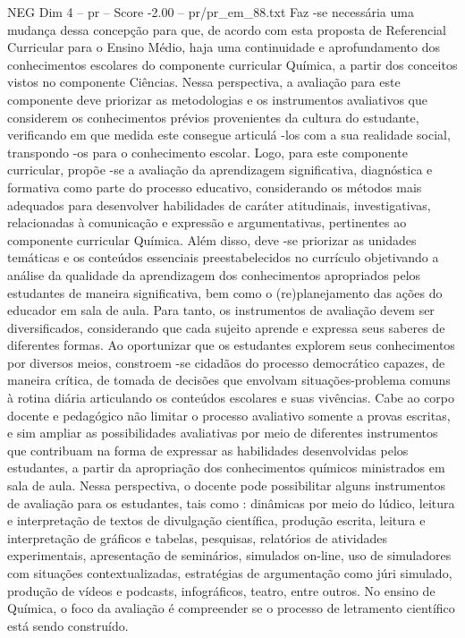 \begin{textsample}{NEG Dim 4 – pr – Score -2.00 – pr/pr\_em\_88.txt}
Faz -se necessária uma mudança dessa concepção para que, de acordo com esta proposta de Referencial Curricular para o Ensino Médio, haja uma continuidade e aprofundamento dos conhecimentos escolares do componente curricular Química, a partir dos conceitos vistos no componente Ciências.
Nessa perspectiva, a avaliação para este componente deve priorizar as metodologias e os instrumentos avaliativos que considerem os conhecimentos prévios provenientes da cultura do estudante, verificando em que medida este consegue articulá -los com a sua realidade social, transpondo -os para o conhecimento escolar.
Logo, para este componente curricular, propõe -se a avaliação da aprendizagem significativa, diagnóstica e formativa como parte do processo educativo, considerando os métodos mais adequados para desenvolver habilidades de caráter atitudinais, investigativas, relacionadas à comunicação e expressão e argumentativas, pertinentes ao componente curricular Química.
Além disso, deve -se priorizar as unidades temáticas e os conteúdos essenciais preestabelecidos no currículo objetivando a análise da qualidade da aprendizagem dos conhecimentos apropriados pelos estudantes de maneira significativa, bem como o (re)planejamento das ações do educador em sala de aula.
Para tanto, os instrumentos de avaliação devem ser diversificados, considerando que cada sujeito aprende e expressa seus saberes de diferentes formas.
Ao oportunizar que os estudantes explorem seus conhecimentos por diversos meios, constroem -se cidadãos do processo democrático capazes, de maneira crítica, de tomada de decisões que envolvam situações-problema comuns à rotina diária articulando os conteúdos escolares e suas vivências.
Cabe ao corpo docente e pedagógico não limitar o processo avaliativo somente a provas escritas, e sim ampliar as possibilidades avaliativas por meio de diferentes instrumentos que contribuam na forma de expressar as habilidades desenvolvidas pelos estudantes, a partir da apropriação dos conhecimentos químicos ministrados em sala de aula.
Nessa perspectiva, o docente pode possibilitar alguns instrumentos de avaliação para os estudantes, tais como : dinâmicas por meio do lúdico, leitura e interpretação de textos de divulgação científica, produção escrita, leitura e interpretação de gráficos e tabelas, pesquisas, relatórios de atividades experimentais, apresentação de seminários, simulados on-line, uso de simuladores com situações contextualizadas, estratégias de argumentação como júri simulado, produção de vídeos e podcasts, infográficos, teatro, entre outros.
No ensino de Química, o foco da avaliação é compreender se o processo de letramento científico está sendo construído.

\end{textsample}
